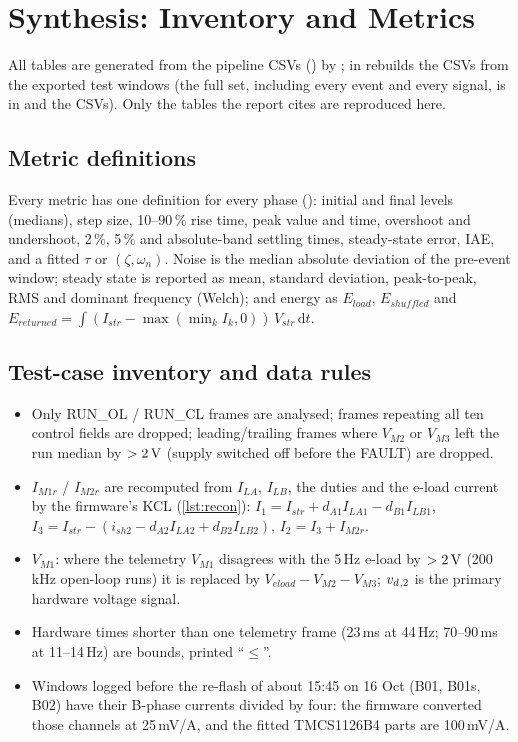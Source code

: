 \section{Synthesis: Inventory and Metrics}
\label{app:synth}
{\sloppy All tables are generated from the pipeline CSVs () by ;  in  rebuilds the CSVs from the exported test windows (the full set, including every event and every signal, is in  and the CSVs). Only the tables the report cites are reproduced here.\par}

\subsection{Metric definitions}
Every metric has one definition for every phase (): initial and final levels (medians), step size, 10--90\,\% rise time, peak value and time, overshoot and undershoot, 2\,\%, 5\,\% and absolute-band settling times, steady-state error, IAE, and a fitted $\tau$ or $(\zeta, \omega_n)$. Noise is the median absolute deviation of the pre-event window; steady state is reported as mean, standard deviation, peak-to-peak, RMS and dominant frequency (Welch); and energy as $E_{load}$, $E_{shuffled}$ and $E_{returned} = \int (I_{str} - \max(\min_k I_k, 0))\,V_{str}\,\mathrm{d}t$.

\subsection{Test-case inventory and data rules}

\begin{itemize}
  \item Only RUN\_OL / RUN\_CL frames are analysed; frames repeating all ten control fields are dropped; leading/trailing frames where $V_{M2}$ or $V_{M3}$ left the run median by $>2\,\mathrm{V}$ (supply switched off before the FAULT) are dropped.
  \item $I_{M1r}$ / $I_{M2r}$ are recomputed from $I_{LA}$, $I_{LB}$, the duties and the e-load current by the firmware's KCL (\cref{lst:recon}): $I_1 = I_{str} + d_{A1}I_{LA1} - d_{B1}I_{LB1}$, $I_3 = I_{str} - (i_{sh2} - d_{A2}I_{LA2} + d_{B2}I_{LB2})$, $I_2 = I_3 + I_{M2r}$.
  \item $V_{M1}$: where the telemetry $V_{M1}$ disagrees with the 5\,Hz e-load by $>2\,\mathrm{V}$ (200\,kHz open-loop runs) it is replaced by $V_{eload} - V_{M2} - V_{M3}$; $v_{d}{}_{,2}$ is the primary hardware voltage signal.
  \item Hardware times shorter than one telemetry frame (23\,ms at 44\,Hz; 70--90\,ms at 11--14\,Hz) are bounds, printed ``$\le$''.
  \item Windows logged before the re-flash of about 15:45 on 16 Oct (B01, B01s, B02) have their B-phase currents divided by four: the firmware converted those channels at 25\,mV/A, and the fitted TMCS1126B4 parts are 100\,mV/A.
\end{itemize}
\FloatBarrier


